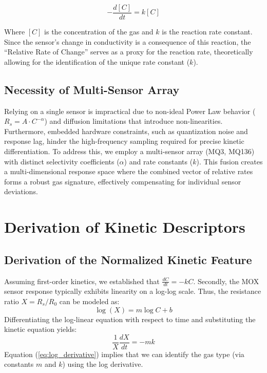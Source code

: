\documentclass[conference]{IEEEtran}
\begin{document}
\begin{equation}
-\frac{d[C]}{dt} = k[C]
\label{eq:kinetics}
\end{equation}

Where $[C]$ is the concentration of the gas and $k$ is the reaction rate constant. Since the sensor's change in conductivity is a consequence of this reaction, the ``Relative Rate of Change'' serves as a proxy for the reaction rate, theoretically allowing for the identification of the unique rate constant ($k$).

\subsection{Necessity of Multi-Sensor Array}
Relying on a single sensor is impractical due to non-ideal Power Law behavior ($R_s = A \cdot C^{-\alpha}$) and diffusion limitations that introduce non-linearities. Furthermore, embedded hardware constraints, such as quantization noise and response lag, hinder the high-frequency sampling required for precise kinetic differentiation. To address this, we employ a multi-sensor array (MQ3, MQ136) with distinct selectivity coefficients ($\alpha$) and rate constants ($k$). This fusion creates a multi-dimensional response space where the combined vector of relative rates forms a robust gas signature, effectively compensating for individual sensor deviations.

\section{Derivation of Kinetic Descriptors}

\subsection{Derivation of the Normalized Kinetic Feature}
Assuming first-order kinetics, we established that $\frac{dC}{dt} = -kC$. 
Secondly, the MOX sensor response typically exhibits linearity on a log-log scale. Thus, the resistance ratio $X = R_s/R_0$ can be modeled as:
\begin{equation}
\log(X) = m \log C + b
\end{equation}
Differentiating the log-linear equation with respect to time and substituting the kinetic equation yields:
\begin{equation}
\frac{1}{X} \frac{dX}{dt} = -mk
\label{eq:log_derivative}
\end{equation}
Equation (\ref{eq:log_derivative}) implies that we can identify the gas type (via constants $m$ and $k$) using the log derivative.
\end{document}
